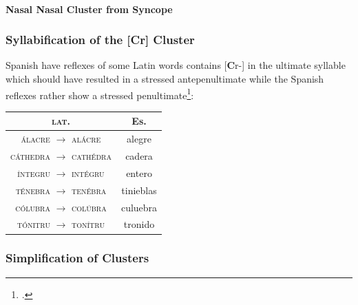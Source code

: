 \documentclass{report}[12pt]
\begin{document}
\paragraph*{Nasal Nasal Cluster from Syncope}

\subsubsection{Syllabification of the [Cr] Cluster}

Spanish have reflexes of some Latin words contains [\textbf{C}r-] in the ultimate syllable which should have resulted in a stressed antepenultimate while the Spanish reflexes rather show a stressed penultimate\footcite[p.~115]{lloyd_spanish}:
\begin{center}
  \begin{tabular}{c c}
    \textsc{lat.} & Es. \\
    \hline
    \textsc{\'{a}lacre} $\rightarrow$ \textsc{al\'{a}cre} & alegre \\
    \textsc{c\'{a}thedra} $\rightarrow$ \textsc{cath\'{e}dra} & cadera \\
    \textsc{\'{i}ntegru} $\rightarrow$ \textsc{int\'{e}gru} & entero \\
    \textsc{t\'{e}nebra} $\rightarrow$ \textsc{ten\'{e}bra} & tinieblas \\
    \textsc{c\'{o}lubra} $\rightarrow$ \textsc{col\'{u}bra} & culuebra \\
    \textsc{t\'{o}nitru} $\rightarrow$ \textsc{ton\'{i}tru} & tronido \\
  \end{tabular}
\end{center}

\subsubsection{Simplification of Clusters}

\begin{tcolorbox}
  
\end{tcolorbox}

\pagebreak
\end{document}
